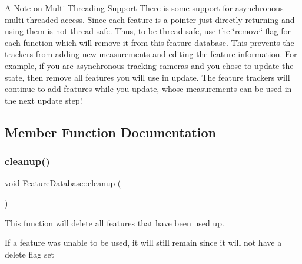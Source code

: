 \begin{DoxyParagraph}{A Note on Multi-\/\+Threading Support}
There is some support for asynchronous multi-\/threaded access. Since each feature is a pointer just directly returning and using them is not thread safe. Thus, to be thread safe, use the \char`\"{}remove\char`\"{} flag for each function which will remove it from this feature database. This prevents the trackers from adding new measurements and editing the feature information. For example, if you are asynchronous tracking cameras and you chose to update the state, then remove all features you will use in update. The feature trackers will continue to add features while you update, whose measurements can be used in the next update step! 
\end{DoxyParagraph}


\subsection{Member Function Documentation}
\mbox{\label{classov__core_1_1FeatureDatabase_abee9d8a5fa7fc4a97911058b6e8d10a0}} 
\subsubsection{\texorpdfstring{cleanup()}{cleanup()}}
{\footnotesize\ttfamily void Feature\+Database\+::cleanup (\begin{DoxyParamCaption}{ }\end{DoxyParamCaption})}



This function will delete all features that have been used up. 

If a feature was unable to be used, it will still remain since it will not have a delete flag set \mbox{\label{classov__core_1_1FeatureDatabase_a144b59272688f0aeea0ecec6028dca04}} 
